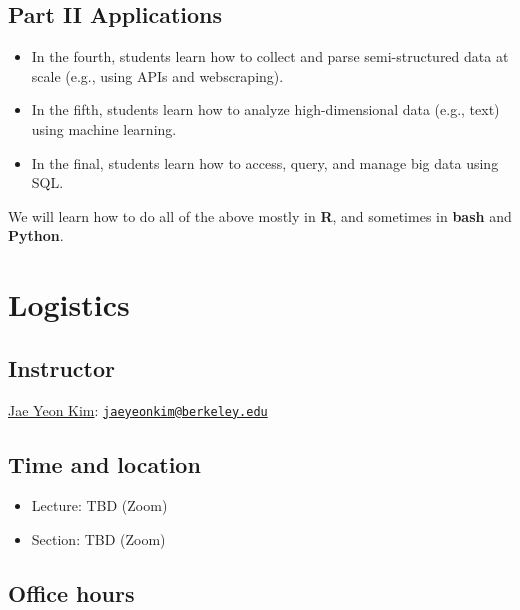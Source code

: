 \documentclass[
]{book}
\begin{document}
\hypertarget{part-ii-applications}{%
\subsection{Part II Applications}\label{part-ii-applications}}

\begin{itemize}
\item
  In the fourth, students learn how to collect and parse semi-structured data at scale (e.g., using APIs and webscraping).
\item
  In the fifth, students learn how to analyze high-dimensional data (e.g., text) using machine learning.
\item
  In the final, students learn how to access, query, and manage big data using SQL.
\end{itemize}

We will learn how to do all of the above mostly in \textbf{R}, and sometimes in \textbf{bash} and \textbf{Python}.

\hypertarget{logistics}{%
\section{Logistics}\label{logistics}}

\hypertarget{instructor}{%
\subsection{Instructor}\label{instructor}}

\href{https://jaeyk.github.io/}{Jae Yeon Kim}: \href{mailto:jaeyeonkim@berkeley.edu}{\nolinkurl{jaeyeonkim@berkeley.edu}}

\hypertarget{time-and-location}{%
\subsection{Time and location}\label{time-and-location}}

\begin{itemize}
\item
  Lecture: TBD (Zoom)
\item
  Section: TBD (Zoom)
\end{itemize}

\hypertarget{office-hours}{%
\subsection{Office hours}\label{office-hours}}
\end{document}
